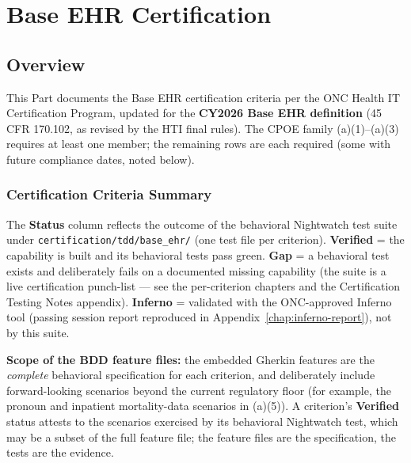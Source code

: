 \part{Base EHR Certification}

\chapter*{Overview}

This Part documents the Base EHR certification criteria per the ONC Health IT Certification Program, updated for the \textbf{CY2026 Base EHR definition} (45 CFR 170.102, as revised by the HTI final rules). The CPOE family (a)(1)--(a)(3) requires at least one member; the remaining rows are each required (some with future compliance dates, noted below).

\section*{Certification Criteria Summary}

The \textbf{Status} column reflects the outcome of the behavioral Nightwatch test suite under \texttt{certification/tdd/base\_ehr/} (one test file per criterion). \textbf{Verified} = the capability is built and its behavioral tests pass green. \textbf{Gap} = a behavioral test exists and deliberately fails on a documented missing capability (the suite is a live certification punch-list --- see the per-criterion chapters and the Certification Testing Notes appendix). \textbf{Inferno} = validated with the ONC-approved Inferno tool (passing session report reproduced in Appendix~\ref{chap:inferno-report}), not by this suite.

\textbf{Scope of the BDD feature files:} the embedded Gherkin features are the \emph{complete} behavioral specification for each criterion, and deliberately include forward-looking scenarios beyond the current regulatory floor (for example, the pronoun and inpatient mortality-data scenarios in (a)(5)). A criterion's \textbf{Verified} status attests to the scenarios exercised by its behavioral Nightwatch test, which may be a subset of the full feature file; the feature files are the specification, the tests are the evidence.

